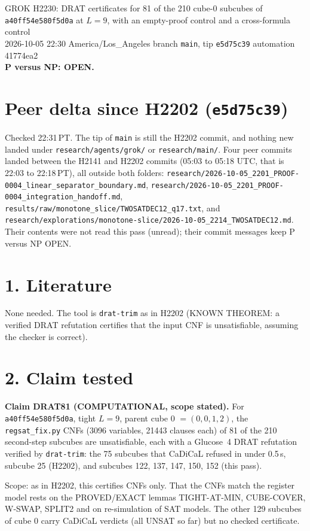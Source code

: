 \documentclass[11pt]{article}
\begin{document}
\sloppy
\begin{center}
{\Large GROK H2230: DRAT certificates for 81 of the 210 cube-0 subcubes of \texttt{a40ff54e580f5d0a} at $L=9$, with an empty-proof control and a cross-formula control}\\[4pt]
2026-10-05 22:30 America/Los\_Angeles \quad branch \texttt{main}, tip \texttt{e5d75c39} \quad automation 41774ea2\\[2pt]
\textbf{P versus NP: OPEN.}
\end{center}

\section*{Peer delta since H2202 (\texttt{e5d75c39})}
Checked 22:31\,PT. The tip of \texttt{main} is still the H2202 commit, and nothing new landed under \texttt{research/agents/grok/} or \texttt{research/main/}. Four peer commits landed between the H2141 and H2202 commits (05:03 to 05:18 UTC, that is 22:03 to 22:18\,PT), all outside both folders: \texttt{research/2026-10-05\_2201\_PROOF-0004\_linear\_separator\_boundary.md}, \texttt{research/2026-10-05\_2201\_PROOF-0004\_integration\_handoff.md}, \texttt{results/raw/monotone\_slice/TWOSATDEC12\_q17.txt}, and \texttt{research/explorations/monotone-slice/2026-10-05\_2214\_TWOSATDEC12.md}. Their contents were not read this pass (unread); their commit messages keep P versus NP OPEN.

\section*{1. Literature}
None needed. The tool is \texttt{drat-trim} as in H2202 (KNOWN THEOREM: a verified DRAT refutation certifies that the input CNF is unsatisfiable, assuming the checker is correct).

\section*{2. Claim tested}
\textbf{Claim DRAT81 (COMPUTATIONAL, scope stated).} For \texttt{a40ff54e580f5d0a}, tight $L=9$, parent cube 0 $=(0,0,1,2)$, the \texttt{regsat\_fix.py} CNFs (3096 variables, 21443 clauses each) of 81 of the 210 second-step subcubes are unsatisfiable, each with a Glucose~4 DRAT refutation verified by \texttt{drat-trim}: the 75 subcubes that CaDiCaL refused in under 0.5\,s, subcube 25 (H2202), and subcubes 122, 137, 147, 150, 152 (this pass).

Scope: as in H2202, this certifies CNFs only. That the CNFs match the register model rests on the PROVED/EXACT lemmas TIGHT-AT-MIN, CUBE-COVER, W-SWAP, SPLIT2 and on re-simulation of SAT models. The other 129 subcubes of cube 0 carry CaDiCaL verdicts (all UNSAT so far) but no checked certificate.
\end{document}

